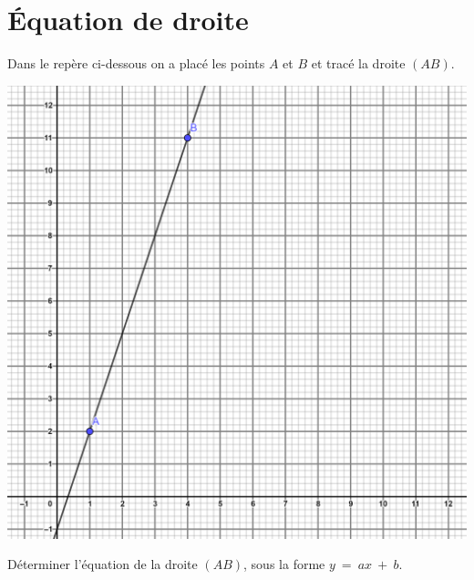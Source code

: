 %		
%	
%		
%		
%	
	
\section{\'Equation de droite}

Dans le repère ci-dessous on a placé les points $A$ et $B$ et tracé la droite $(AB)$.


\begin{center}
	\includegraphics[scale=0.18]{img/droite1_2}
\end{center}

\begin{questions}

	
	\question[5] Déterminer l'équation de la droite $(AB)$, sous la forme $y\:=\:ax\:+\:b $.
	\fillwithdottedlines{9cm}
\end{questions}

